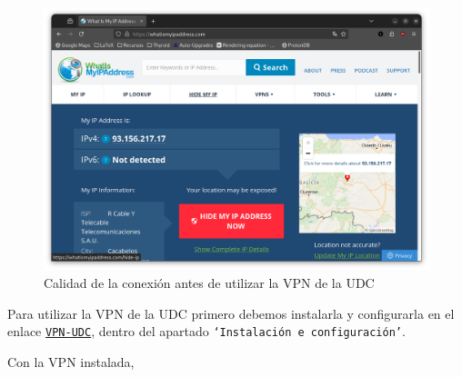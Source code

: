 \begin{figure}[H]
    \centering
    \includegraphics[width=\linewidth]{CalidadConexion-UDC.png}
    \caption{Calidad de la conexión antes de utilizar la VPN de la UDC}
    \label{fig:Calidad-Conexión-preUDC}
\end{figure}


Para utilizar la VPN de la UDC primero debemos instalarla y configurarla en el enlace \href{https://axudatic.udc.gal/pages/viewpage.action?pageId=45813771}{\texttt{VPN-UDC}}, dentro del apartado \texttt{`Instalación e configuración'}.

Con la VPN instalada,
